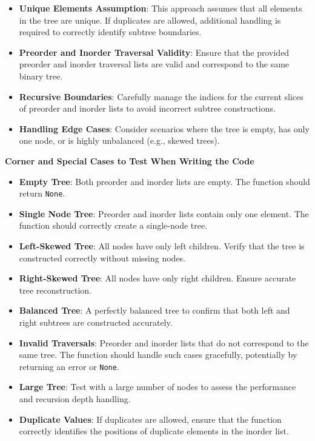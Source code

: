 \begin{itemize}
    \item \textbf{Unique Elements Assumption}: This approach assumes that all elements in the tree are unique. If duplicates are allowed, additional handling is required to correctly identify subtree boundaries.
    \item \textbf{Preorder and Inorder Traversal Validity}: Ensure that the provided preorder and inorder traversal lists are valid and correspond to the same binary tree.
    \item \textbf{Recursive Boundaries}: Carefully manage the indices for the current slices of preorder and inorder lists to avoid incorrect subtree constructions.
    \item \textbf{Handling Edge Cases}: Consider scenarios where the tree is empty, has only one node, or is highly unbalanced (e.g., skewed trees).
\end{itemize}

\textbf{Corner and Special Cases to Test When Writing the Code}

\begin{itemize}
    \item \textbf{Empty Tree}: Both preorder and inorder lists are empty. The function should return \texttt{None}.
    \item \textbf{Single Node Tree}: Preorder and inorder lists contain only one element. The function should correctly create a single-node tree.
    \item \textbf{Left-Skewed Tree}: All nodes have only left children. Verify that the tree is constructed correctly without missing nodes.
    \item \textbf{Right-Skewed Tree}: All nodes have only right children. Ensure accurate tree reconstruction.
    \item \textbf{Balanced Tree}: A perfectly balanced tree to confirm that both left and right subtrees are constructed accurately.
    \item \textbf{Invalid Traversals}: Preorder and inorder lists that do not correspond to the same tree. The function should handle such cases gracefully, potentially by returning an error or \texttt{None}.
    \item \textbf{Large Tree}: Test with a large number of nodes to assess the performance and recursion depth handling.
    \item \textbf{Duplicate Values}: If duplicates are allowed, ensure that the function correctly identifies the positions of duplicate elements in the inorder list.
\end{itemize}